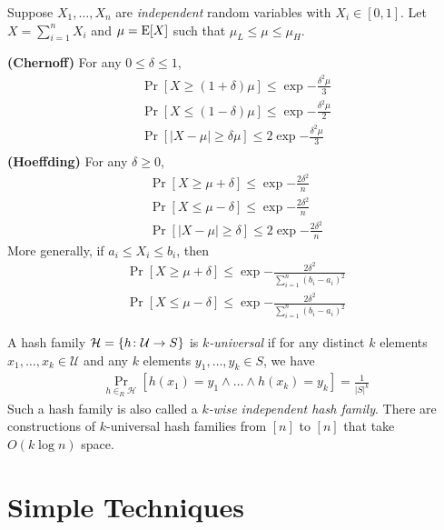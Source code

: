 \documentclass{article}
\begin{document}
\begin{lemma}
  Suppose $X_1, \ldots, X_n$ are \emph{independent} random variables with $X_i \in [0, 1]$.
  Let $X = \sum_{i=1}^n X_i$ and $\mu = \operatorname{E}[X]$ such that $\mu_L \leq \mu \leq \mu_H$.

\textbf{(Chernoff)} For any $0 \leq \delta \leq 1$,
  \begin{align}
    \Pr[X \geq (1 + \delta)\mu] \le \exp{-\frac{\delta^2\mu}{3}}
    \\
    \Pr[X \leq (1 - \delta)\mu] \le \exp{-\frac{\delta^2\mu}{2}}
    \\
    \Pr \left[ |X - \mu| \geq \delta \mu \right] \le 2 \exp{-\frac{\delta^2\mu}{3}}
    \\
  \end{align}
\textbf{(Hoeffding)} For any $\delta \geq 0$,
  \begin{align}
    \Pr[X \geq \mu + \delta] \le \exp{-\frac{2\delta^2}{n}}
    \\
    \Pr[X \leq \mu - \delta] \le \exp{-\frac{2\delta^2}{n}}
    \\
    \Pr \left[ |X - \mu| \geq \delta \right] \le 2 \exp{-\frac{2\delta^2}{n}}
  \end{align}
  More generally, if $a_i \leq X_i \leq b_i$, then
  \begin{align}
    \Pr[X \geq \mu + \delta] \le \exp{-\frac{2\delta^2}{\sum_{i=1}^n (b_i - a_i)^2}}
    \\
    \Pr[X \leq \mu - \delta] \le \exp{-\frac{2\delta^2}{\sum_{i=1}^n (b_i - a_i)^2}}
  \end{align}
\end{lemma}

\begin{definition}
  A hash family $\mathcal{H} = \{h \colon \mathcal{U} \to S\}$ is \emph{$k$-universal} if for any distinct $k$ elements $x_1, \ldots, x_k \in \mathcal{U}$ and any $k$ elements $y_1, \ldots, y_k \in S$, we have
  \begin{align}
    \Pr_{h \in_R \mathcal{H}}[h(x_1) = y_1 \land \ldots \land h(x_k) = y_k] = \frac{1}{|S|^k}
  \end{align}
  Such a hash family is also called a \emph{$k$-wise independent hash family}.
  There are constructions of $k$-universal hash families from $[n]$ to $[n]$ that take $O(k \log n)$ space.
\end{definition}

\pagebreak

\section{Simple Techniques}
\end{document}
